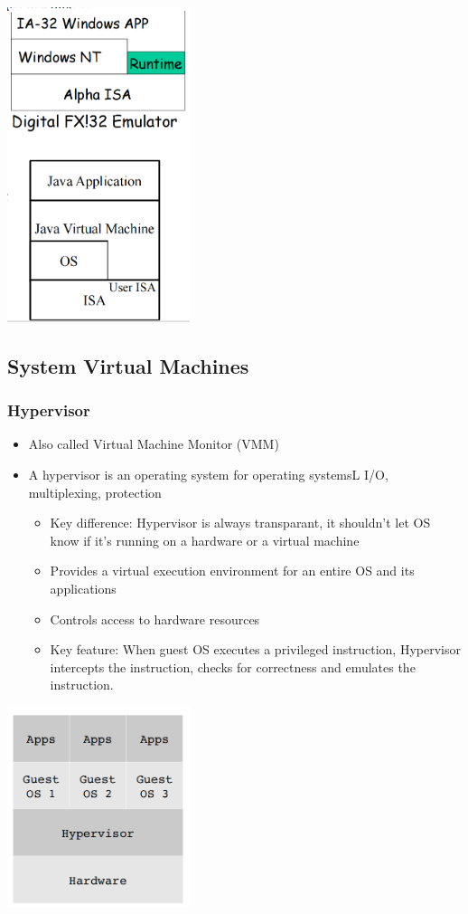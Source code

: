 \documentclass[12pt]{article}
\begin{document}
\includegraphics[width=0.4\textwidth]{ProcessVMExample.png}

\subsection{System Virtual Machines}
\subsubsection{Hypervisor}
\begin{itemize}
    \item Also called Virtual Machine Monitor (VMM)
    \item A hypervisor is an operating system for operating systemsL I/O, multiplexing, protection \begin{itemize}
        \item Key difference: Hypervisor is always transparant, it shouldn't let OS know if it's running on a hardware or a virtual machine
        \item Provides a virtual execution environment for an entire OS and its applications
        \item Controls access to hardware resources
        \item Key feature: When guest OS executes a privileged instruction, Hypervisor intercepts the instruction, checks for correctness and emulates the instruction.
    \end{itemize}
\end{itemize}
\includegraphics[width=0.4\textwidth]{Hypervisor.png}
\end{document}
